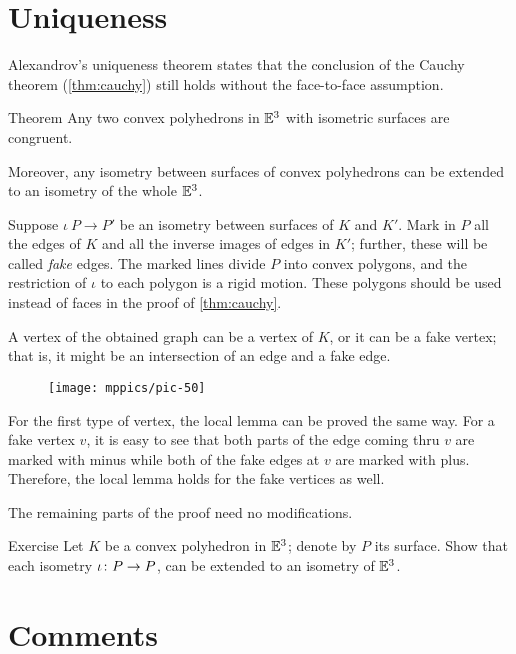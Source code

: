 \section{Uniqueness}

Alexandrov's uniqueness theorem states that the conclusion of the Cauchy theorem (\ref{thm:cauchy}) still holds without the face-to-face assumption.

\begin{thm}{Theorem}\label{thm:alexandrov-uni'}
Any two convex polyhedrons in $\mathbb{E}^3$ with isometric surfaces are congruent.

Moreover, any isometry between surfaces of convex polyhedrons can be extended to an isometry of the whole $\mathbb{E}^3$.
\end{thm}

Suppose $\iota\:P\to P'$ be an isometry between surfaces of $K$ and $K'$.
Mark in $P$ all the edges of $K$ and all the inverse images of edges in $K'$; further, these will be called \emph{fake} edges.
The marked lines divide $P$ into convex polygons, and the restriction of $\iota$ to each polygon is a rigid motion.
These polygons should be used instead of faces in the proof of \ref{thm:cauchy}.

A vertex of the obtained graph can be a vertex of $K$, or it can be a fake vertex;
that is, it might be an intersection of an edge and a fake edge.

\begin{figure}[ht!]
\vskip-0mm
\centering
\texttt{[image: mppics/pic-50]}
\vskip-0mm
\end{figure}

For the first type of vertex, the local lemma can be proved the same way.
For a fake vertex $v$, it is easy to see that both parts of the edge coming thru $v$ are marked with minus
while both of the fake edges at $v$ are marked with plus.
Therefore, the local lemma holds for the fake vertices as well.

The remaining parts of the proof need no modifications.
\qeds

\begin{thm}{Exercise}\label{pr:K-P-simmetry}
Let $K$ be a convex polyhedron in $\mathbb{E}^3$;
denote by $P$ its surface.
Show that each isometry $\iota\colon P\to P$,
can be extended to an isometry of $\mathbb{E}^3$.
\end{thm}


\section{Comments}

